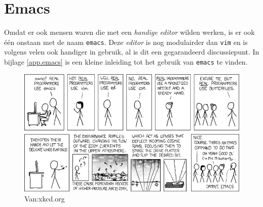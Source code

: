 \section{Emacs}
Omdat er ook mensen waren die met een \emph{handige} \emph{editor} wilden werken, is er ook \'{e}\'{e}n onstaan met de naam \texttt{emacs}. Deze \emph{editor} is nog modulairder dan \texttt{vim} en is volgens velen ook handiger in gebruik, al is dit een gegarandeerd discussiepunt. In bijlage \ref{app.emacs} is een kleine inleiding tot het gebruik van \texttt{emacs} te vinden. 

\begin{figure}[H]
  \begin{center}
    \includegraphics[scale=0.5]{images/real_programmers}
  \end{center}
  \caption{Van:xkcd.org}
  \label{fig:XKCD_emacs_butterfly}
\end{figure}
